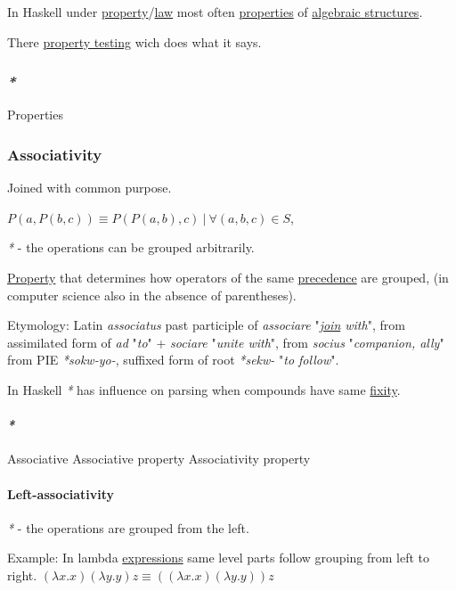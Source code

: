 \documentclass[a4paper,14pt,oneside]{book}
\begin{document}
In Haskell under \hyperref[orgc187516]{property}/\hyperref[org57a581c]{law} most often \hyperref[orgdc6e763]{properties} of \hyperref[org9d1f638]{algebraic structures}.

There \hyperref[org6a048ba]{property testing} wich does what it says.

\subsubsection{\emph{*}}
\label{sec:org4944068}

\label{orgdc6e763}Properties

\subsubsection{\label{orgd31eae7}Associativity}
\label{sec:org536a71b}
Joined with common purpose.

\(P(a,P(b,c)) \equiv P(P(a,b),c) \ | \ \forall (a,b,c) \in S\),

\emph{*} - the operations can be grouped arbitrarily.

\hyperref[orgc187516]{Property} that determines how operators of the same \hyperref[org82d43fe]{precedence} are grouped, (in computer science also in the absence of parentheses).

Etymology:
Latin \emph{associatus} past participle of \emph{associare} "\emph{\hyperref[org0086900]{join} with}", from assimilated form of \emph{ad} "\emph{to}" + \emph{sociare} "\emph{unite with}", from \emph{socius} "\emph{companion, ally}" from PIE \emph{*sokw-yo-}, suffixed form of root \emph{*sekw-} "\emph{to follow}".

In Haskell \emph{*} has influence on parsing when compounds have same \hyperref[orgadf511a]{fixity}.

\paragraph{\emph{*}}
\label{sec:orgbc5619b}

\label{orgf53d065}Associative
\label{org7e39478}Associative property
\label{org5be7310}Associativity property

\paragraph{\label{org28e968d}Left-associativity}
\label{sec:org15a9c52}
\emph{*} - the operations are grouped from the left.

Example:
In lambda \hyperref[org51c23b8]{expressions} same level parts follow grouping from left to right.
\((\lambda x . x)(\lambda y . y)z \equiv ((\lambda x . x)(\lambda y . y))z\)
\end{document}
